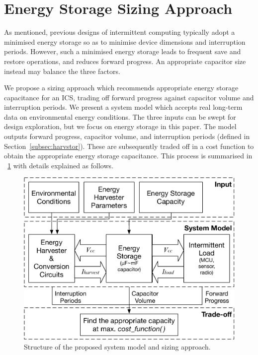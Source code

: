 
\section{Energy Storage Sizing Approach} \label{section:approach}

As mentioned, previous designs of intermittent computing typically adopt a minimised energy storage so as to minimise device dimensions and interruption periods. 
However, such a minimised energy storage leads to frequent save and restore operations, and reduces forward progress.
An appropriate capacitor size instead may balance the three factors. 

We propose a sizing approach which recommends appropriate energy storage capacitance for an ICS, trading off forward progress against capacitor volume and interruption periods. 
We present a system model which accepts real long-term data on environmental energy conditions. 
The three inputs can be swept for design exploration, but we focus on energy storage in this paper. 
The model outputs forward progress, capacitor volume, and interruption periods (defined in Section~\ref{subsec:harvstor}). 
These are subsequently traded off in a cost function to obtain the appropriate energy storage capacitance. 
This process is summarised in \figurename{~\ref{fig:sizingapproach}} with details explained as follows. 

\begin{figure}[!t]
    \centering
    \includegraphics[width=0.8\columnwidth]{ch4_sizingapproach/figures/mdlfrw4}
    \caption{Structure of the proposed system model and sizing approach.}
    \label{fig:sizingapproach}
\end{figure}

